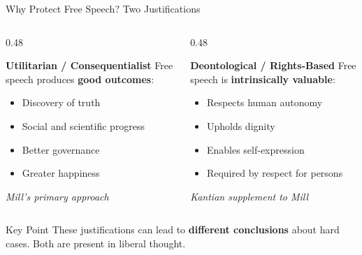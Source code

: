 ﻿\documentclass[aspectratio=169]{beamer}
\begin{document}
\begin{frame}{Why Protect Free Speech? Two Justifications}
\begin{columns}[T]
\begin{column}{0.48\textwidth}
\begin{block}{\textbf{Utilitarian / Consequentialist}}
Free speech produces \textbf{good outcomes}:
\begin{itemize}
    \item Discovery of truth
    \item Social and scientific progress
    \item Better governance
    \item Greater happiness
\end{itemize}
\textit{Mill's primary approach}
\end{block}
\end{column}

\begin{column}{0.48\textwidth}
\begin{block}{\textbf{Deontological / Rights-Based}}
Free speech is \textbf{intrinsically valuable}:
\begin{itemize}
    \item Respects human autonomy
    \item Upholds dignity
    \item Enables self-expression
    \item Required by respect for persons
\end{itemize}
\textit{Kantian supplement to Mill}
\end{block}
\end{column}
\end{columns}

\vspace{0.4cm}
\begin{alertblock}{Key Point}
These justifications can lead to \textbf{different conclusions} about hard cases. Both are present in liberal thought.
\end{alertblock}
\end{frame}
\end{document}
